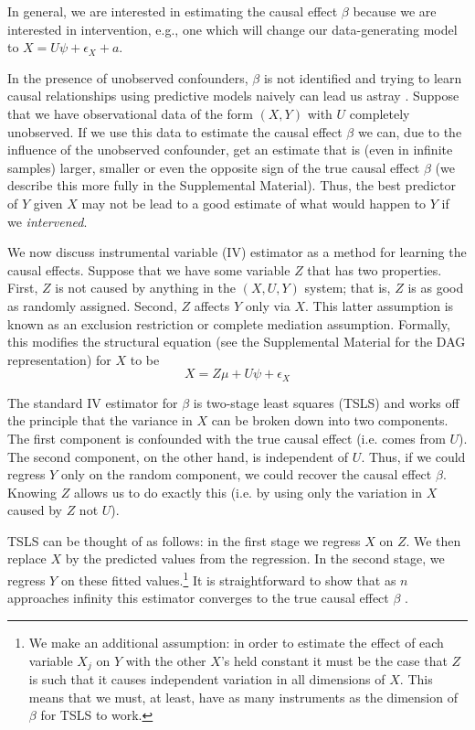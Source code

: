 \documentclass{article}
\begin{document}
In general, we are interested in estimating the causal effect $\beta$ because we are interested in intervention, e.g., one which will change our data-generating model to $X = U\psi + \epsilon_{X} + a.$ 

In the presence of unobserved confounders, $\beta$ is not identified and trying to learn causal relationships using predictive models naively can lead us astray \citep{bottou2013counterfactual, bottou2014machine, shalit2016bounding, pearl2009causality}. Suppose that we have observational data of the form $(X, Y)$ with $U$ completely unobserved. If we use this data to estimate the causal effect $\beta$ we can, due to the influence of the unobserved confounder, get an estimate that is (even in infinite samples) larger, smaller or even the opposite sign of the true causal effect $\beta$ (we describe this more fully in the Supplemental Material). Thus, the best predictor of $Y$ given $X$ may not be lead to a good estimate of what would happen to $Y$ if we \textit{intervened}.

We now discuss instrumental variable (IV) estimator as a method for learning the causal effects. Suppose that we have some variable $Z$ that has two properties. First, $Z$ is not caused by anything in the $(X, U, Y)$ system; that is, $Z$ is as good as randomly assigned. Second, $Z$ affects $Y$ only via $X$. This latter assumption is known as an exclusion restriction or complete mediation assumption. Formally, this modifies the structural equation (see the Supplemental Material for the DAG representation) for $X$ to be
$$
X = Z \mu + U \psi + \epsilon_{X}
$$

The standard IV estimator for $\beta$ is two-stage least squares (TSLS) and works off the principle that the variance in $X$ can be broken down into two components. The first component is confounded with the true causal effect (i.e. comes from $U$). The second component, on the other hand, is independent of $U$. Thus, if we could regress $Y$ only on the random component, we could recover the causal effect $\beta$. Knowing $Z$ allows us to do exactly this (i.e. by using only the variation in $X$ caused by $Z$ not $U$).

TSLS can be thought of as follows: in the first stage we regress $X$ on $Z$. We then replace $X$ by the predicted values from the regression. In the second stage, we regress $Y$ on these fitted values.\footnote{
We make an additional assumption: in order to estimate the effect of each variable $X_{j}$ on $Y$ with the other $X$'s held constant it must be the case that $Z$ is such that it causes independent variation in all dimensions of $X$. This means that we must, at least, have as many instruments as the dimension of $\beta$ for TSLS to work.
} It is straightforward to show that as $n$ approaches infinity this estimator converges to the true causal effect $\beta$ \citep[Theorem 5.1]{wooldridge2010econometric}.
\end{document}
